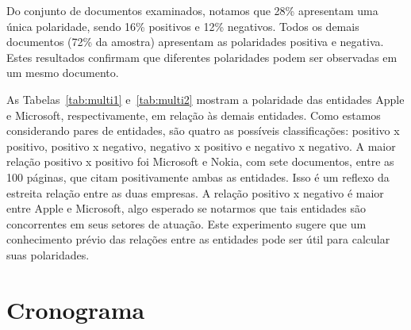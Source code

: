 \documentclass[a4paper,12pt]{article}
\begin{document}

Do conjunto de documentos examinados, notamos que 28\% apresentam uma única polaridade, sendo 16\% positivos e 12\% negativos. Todos os demais documentos (72\% da amostra) apresentam as polaridades positiva e negativa. Estes resultados confirmam que diferentes polaridades podem ser observadas em um mesmo documento.

As Tabelas~\ref{tab:multi1} e~\ref{tab:multi2} mostram a polaridade das entidades Apple e Microsoft, respectivamente, em relação às demais entidades. Como estamos considerando pares de entidades, são quatro as possíveis classificações: positivo x positivo, positivo x negativo, negativo x positivo e negativo x negativo. A maior relação positivo x positivo foi Microsoft e Nokia, com sete documentos, entre as 100 páginas, que citam positivamente ambas as entidades. Isso é um reflexo da estreita relação entre as duas empresas. A relação positivo x negativo é maior entre Apple e Microsoft, algo esperado se notarmos que tais entidades são concorrentes em seus setores de atuação. Este experimento sugere que um conhecimento prévio das relações entre as entidades pode ser útil para calcular suas polaridades.

\newpage

\section{Cronograma}
\end{document}
